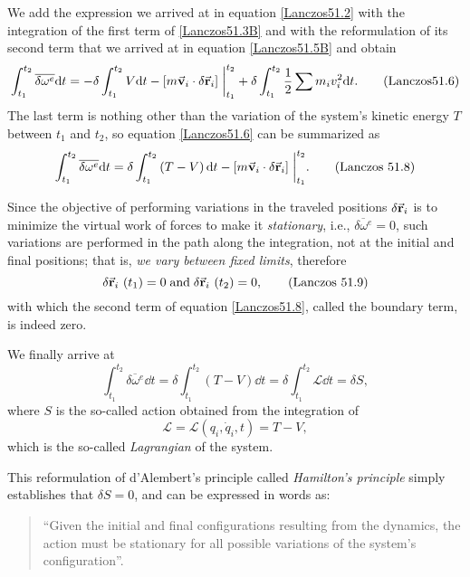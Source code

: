 \documentclass[12pt, spanish, a4paper, ]{article}
\begin{document}
We add the expression we arrived at in equation \eqref{Lanczos51.2} with the integration of the first term of \eqref{Lanczos51.3B} and with the reformulation of its second term that we arrived at in equation \eqref{Lanczos51.5B} and obtain
\begin{equation}\label{Lanczos51.6}
	\int^{t_2}_{t_1} \overline{\delta \omega^e} \dd t=
	- \delta \int^{t_2}_{t_1} V \dd t 
	- \left[ m \va{v}_i \cdot \delta \va{r}_i \right]\eval^{t_2}_{t_1}
	+ \delta \int^{t_2}_{t_1} \frac{1}{2} \sum m_i v_i^2 \dd t .
	\tag{Lanczos51.6}
\end{equation}
The last term is nothing other than the variation of the system's kinetic energy \(T\) between \(t_1\) and \(t_2\), so equation \eqref{Lanczos51.6} can be summarized as
\begin{equation}\label{Lanczos51.8}
    \int^{t_2}_{t_1} \overline{\delta \omega^e} \dd t= \delta \int^{t_2}_{t_1} \left(T - V \right) \dd t - \left[ m \va{v}_i \cdot \delta \va{r}_i \right]\eval^{t_2}_{t_1}.
    \tag{Lanczos 51.8}
\end{equation}

Since the objective of performing variations in the traveled positions \(\delta \va{r}_i\) is to minimize the virtual work of forces to make it \emph{stationary}, i.e., \(\overline{\delta \omega^e}= 0\), such variations are performed in the path along the integration, not at the initial and final positions; that is, \emph{we vary between fixed limits}, therefore
\begin{equation}\label{Lanczos51.9}
	\delta \va{r}_i\ (t_1)=0 \; \text{and} \; 
	\delta \va{r}_i\ (t_2)=0,
	\tag{Lanczos 51.9}
\end{equation}
with which the second term of equation \eqref{Lanczos51.8}, called the boundary term, is indeed zero.

We finally arrive at
\begin{equation}\label{Lanczos51.10}
    \int^{t_2}_{t_1} \overline{\delta \omega^e} \dd t=
	\delta \int^{t_2}_{t_1} \left(T - V \right) \dd t= 
	\delta \int^{t_2}_{t_1} \mathcal{L} \dd t= \delta S,
    \tag{Lanczos 51.10}
\end{equation}
where \(S\) is the so-called action obtained from the integration of
\begin{equation}\label{Lanczos51.11}
	\mathcal{L} = \mathcal{L}(q_i, \dot{q}_i, t) = T - V,
    \tag{Lanczos 51.11}
\end{equation}
which is the so-called \emph{Lagrangian} of the system.

This reformulation of d'Alembert's principle called \emph{Hamilton's principle} simply establishes that \(\delta S= 0\), and can be expressed in words as:
\begin{quote}
``Given the initial and final configurations resulting from the dynamics, the action must be stationary for all possible variations of the system's configuration''. 
\end{quote}
\end{document}
